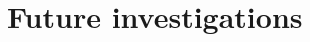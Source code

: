 \documentclass[11pt,a4paper]{article}
\let\mc\mathcal
\let\mf\mathfrak
\newcommand{\Z}{\mathbb{Z}}
\newcommand{\Q}{\mathbb{Q}}
\newcommand{\C}{\mathbb{C}}
\newcommand*{\defeq}{\mathrel{\vcenter{\baselineskip0.5ex \lineskiplimit0pt
      \hbox{\scriptsize.}\hbox{\scriptsize.}}}%
  =}
\renewcommand{\theta}{\vartheta}
\theoremstyle{plain}
\theoremstyle{definition}
\theoremstyle{remark}
\numberwithin{equation}{section}
\begin{document}
\section{Future investigations}
\label{sec:future-research}





\end{document}
